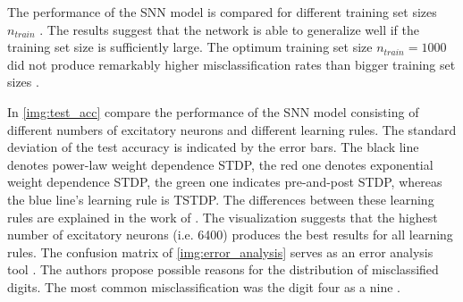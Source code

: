 The performance of the \ac{SNN} model is compared for different training set sizes $n_{train}$ \cite{STDP_like}.
The results suggest that the network is able to generalize well if the training set size is sufficiently large.
The optimum training set size $n_{train} = 1000$ did not produce remarkably higher misclassification rates than bigger training set sizes \cite{STDP_like}.


In \autoref{img:test_acc} \authorsSNN{} \cite{SNN} compare the performance of the \ac{SNN} model consisting of different numbers of excitatory neurons 
and different learning rules.
The standard deviation of the test accuracy is indicated by the error bars.
The black line denotes power-law weight dependence \ac{STDP}, the red one denotes exponential weight dependence \ac{STDP}, 
the green one indicates pre-and-post \ac{STDP}, whereas the blue line's learning rule is \ac{TSTDP}.
The differences between these learning rules are explained in the work of \authorsSNN{} \cite{SNN}.
The visualization suggests that the highest number of excitatory neurons (i.e. 6400) produces the best results for all learning rules.
The confusion matrix of \autoref{img:error_analysis} serves as an error analysis tool \cite{SNN}.
The authors propose possible reasons for the distribution of misclassified digits.
The most common misclassification was the digit four as a nine \cite{SNN}.

